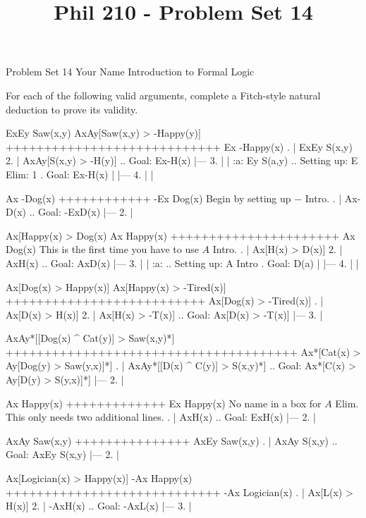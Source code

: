 
\title{Phil 210 - Problem Set 14}

\heading
Problem Set 14
Your Name
Introduction to Formal Logic
\endheading

For each of the following valid arguments, complete a Fitch-style natural deduction to prove its validity.

\quantifiers
\problems
{}
\argument
 ExEy Saw(x,y)
 AxAy[Saw(x,y) > -Happy(y)]
++++++++++++++++++++++++++++
 Ex -Happy(x)
\endargument
        \answer
        . | ExEy S(x,y)
         2. | AxAy[S(x,y) > -H(y)]  ..  Goal: Ex-H(x)
            |---
         3. |   | :a: Ey S(a,y)     ..  Setting up: E Elim: 1  .  Goal: Ex-H(x)
            |   |---
         4. |   |
        \endfitchproof
        \endanswer

\argument
 Ax -Dog(x)
++++++++++++
 -Ex Dog(x)
\endargument
\Hint Begin by setting up $-$ Intro.
        \answer
        . | Ax-D(x)  ..  Goal: -ExD(x)
            |---
         2. | 
        \endfitchproof
        \endanswer

\argument
 Ax[Happy(x) > Dog(x)
 Ax Happy(x)
++++++++++++++++++++++
 Ax Dog(x)
\endargument
\Hint This is the first time you have to use $A$ Intro.
        \answer
        . | Ax[H(x) > D(x)]
         2. | AxH(x)          ..  Goal: AxD(x)
            |---
         3. |   | :a:          ..  Setting up: A Intro  .  Goal: D(a)
            |   |---
         4. |   |
        \endfitchproof
        \endanswer

\argument
 Ax[Dog(x) > Happy(x)]
 Ax[Happy(x) > -Tired(x)]
++++++++++++++++++++++++++
 Ax[Dog(x) > -Tired(x)]
\endargument
        \answer
        . | Ax[D(x) > H(x)]
         2. | Ax[H(x) > -T(x)]  ..  Goal: Ax[D(x) > -T(x)]
            |---
         3. | 
        \endfitchproof
        \endanswer

\argument
 AxAy*[[Dog(x) ^ Cat(y)] > Saw(x,y)*]
++++++++++++++++++++++++++++++++++++++
 Ax*[Cat(x) > Ay[Dog(y) > Saw(y,x)]*]
\endargument
        \answer
        . | AxAy*[[D(x) ^ C(y)] > S(x,y)*]  ..  Goal: Ax*[C(x) > Ay[D(y) > S(y,x)]*]
            |---
         2. | 
        \endfitchproof
        \endanswer

\argument
 Ax Happy(x)
+++++++++++++
 Ex Happy(x)
\endargument
\Hint No name in a box for $A$ Elim. This only needs two additional lines.
        \answer
        . | AxH(x)  ..  Goal: ExH(x)
            |---
         2. | 
        \endfitchproof
        \endanswer

\argument
 AxAy Saw(x,y)
+++++++++++++++
 AxEy Saw(x,y)
\endargument
        \answer
        . | AxAy S(x,y)  ..  Goal: AxEy S(x,y)
            |---
         2. |
        \endfitchproof
        \endanswer

\argument
 Ax[Logician(x) > Happy(x)]
 -Ax Happy(x)
++++++++++++++++++++++++++++
 -Ax Logician(x)
\endargument
        \answer
        . | Ax[L(x) > H(x)]
         2. | -AxH(x)         ..  Goal: -AxL(x)
            |---
         3. |
        \endfitchproof
        \endanswer

\endproblems
\bye

